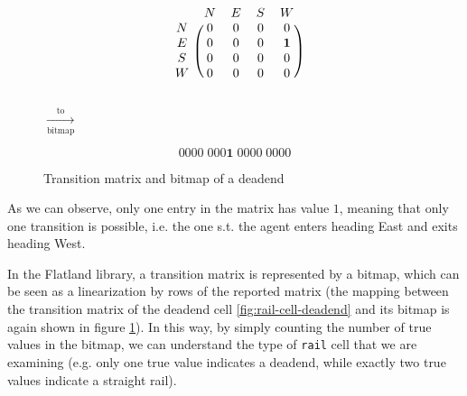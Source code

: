 \documentclass[a4paper,10pt]{report}
\begin{document}
\begin{figure}[h]
	\noindent\begin{minipage}{.5\linewidth}
		\begin{equation*}
			\begin{blockarray}{ccccc}
				& N & E & S & W \\
				\begin{block}{c(cccc)}
					N & 0 & 0 & 0 & 0 \\
					E & 0 & 0 & 0 & \mathbf{1} \\
					S & 0 & 0 & 0 & 0 \\
					W & 0 & 0 & 0 & 0 \\
				\end{block}
			\end{blockarray}
		\end{equation*}
	\end{minipage}%
	$\xrightarrow[\text{bitmap}]{\text{to}}$
	\begin{minipage}{.5\linewidth}
		\begin{equation*}
			0000 \; 000\mathbf{1} \; 0000 \; 0000
		\end{equation*}
	\end{minipage}
	\caption{Transition matrix and bitmap of a deadend}
	\label{fig:rail-cell-bitmap}
\end{figure}

As we can observe, only one entry in the matrix has value $1$, meaning that only one transition is possible, i.e. the one s.t. the agent enters heading East and exits heading West.

In the Flatland library, a transition matrix is represented by a bitmap, which can be seen as a linearization by rows of the reported matrix (the mapping between the transition matrix of the deadend cell \ref{fig:rail-cell-deadend} and its bitmap is again shown in figure \ref{fig:rail-cell-bitmap}). In this way, by simply counting the number of true values in the bitmap, we can understand the type of \texttt{rail} cell that we are examining (e.g. only one true value indicates a deadend, while exactly two true values indicate a straight rail).
\end{document}
